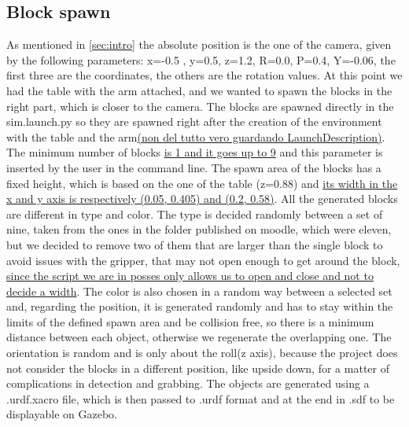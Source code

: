 \documentclass[12pt,a4paper]{article}
\begin{document}
\subsection{Block spawn}\label{subsec:blockspawn}
As mentioned in \ref{sec:intro} the absolute position is the one of the camera, given by the following parameters: x=-0.5 , y=0.5, z=1.2, R=0.0, P=0.4, Y=-0.06, the first three are the coordinates, the others are the rotation values. At this point we had the table with the arm attached, and we wanted to spawn the blocks in the right part, which is closer to the camera. The blocks are spawned directly in the sim.launch.py so they are spawned right after the creation of the environment with the table and the arm\uline{(non del tutto vero guardando LaunchDescription)}. The minimum number of blocks \uline{is 1 and it goes up to 9} and this parameter is inserted by the user in the command line. The spawn area of the blocks has a fixed height, which is based on the one of the table (z=0.88) and \uline{its width in the x and y axis is respectively (0.05, 0.405) and (0.2, 0.58)}. All the generated blocks are different in type and color. The type is decided randomly between a set of nine, taken from the ones in the folder published on moodle, which were eleven, but we decided to remove two of them that are larger than the single block to avoid issues with the gripper, that may not open enough to get around the block, \uline{since the script we are in posses only allows us to open and close and not to decide a width}. The color is also chosen in a random way between a selected set and, regarding the position, it is generated randomly and has to stay within the limits of the defined spawn area and be collision free, so there is a minimum distance between each object, otherwise we regenerate the overlapping one. The orientation is random and is only about the roll(z axis), because the project does not consider the blocks in a different position, like upside down, for a matter of complications in detection and grabbing.
The objects are generated using a .urdf.xacro file, which is then passed to .urdf format and at the end in .sdf to be displayable on Gazebo. 
\end{document}
